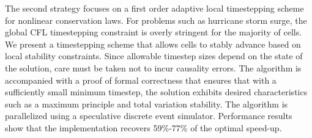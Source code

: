     The second strategy focuses on a first order adaptive local timestepping scheme for nonlinear conservation laws. For problems such as hurricane storm surge, the global CFL timestepping constraint is overly stringent for the majority of cells. We present a timestepping scheme that allows cells to stably advance based on local stability constraints. Since allowable timestep sizes depend on the state of the solution, care must be taken not to incur causality errors. The algorithm is accompanied with a proof of formal correctness that ensures that with a sufficiently small minimum timestep, the solution exhibits desired characteristics such as a maximum principle and total variation stability. The algorithm is parallelized using a speculative discrete event simulator. Performance results show that the implementation recovers 59\%-77\% of the optimal speed-up.
